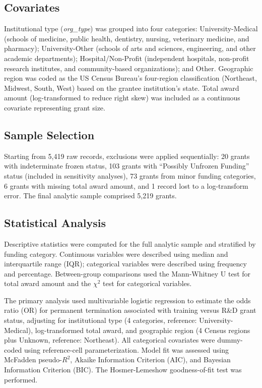 \documentclass[10pt, letterpaper]{article}
\begin{document}
\subsection*{Covariates}

Institutional type (\textit{org\_type}) was grouped into four categories: University-Medical (schools of medicine, public health, dentistry, nursing, veterinary medicine, and pharmacy); University-Other (schools of arts and sciences, engineering, and other academic departments); Hospital/Non-Profit (independent hospitals, non-profit research institutes, and community-based organizations); and Other. Geographic region was coded as the US Census Bureau's four-region classification (Northeast, Midwest, South, West) based on the grantee institution's state. Total award amount (log-transformed to reduce right skew) was included as a continuous covariate representing grant size.

\subsection*{Sample Selection}

Starting from 5,419 raw records, exclusions were applied sequentially: 20 grants with indeterminate frozen status, 103 grants with ``Possibly Unfrozen Funding'' status (included in sensitivity analyses), 73 grants from minor funding categories, 6 grants with missing total award amount, and 1 record lost to a log-transform error. The final analytic sample comprised 5,219 grants.

\subsection*{Statistical Analysis}

Descriptive statistics were computed for the full analytic sample and stratified by funding category. Continuous variables were described using median and interquartile range (IQR); categorical variables were described using frequency and percentage. Between-group comparisons used the Mann-Whitney U test for total award amount and the $\chi^{2}$ test for categorical variables.

The primary analysis used multivariable logistic regression to estimate the odds ratio (OR) for permanent termination associated with training versus R\&D grant status, adjusting for institutional type (4 categories, reference: University-Medical), log-transformed total award, and geographic region (4 Census regions plus Unknown, reference: Northeast). All categorical covariates were dummy-coded using reference-cell parameterization. Model fit was assessed using McFadden pseudo-$R^{2}$, Akaike Information Criterion (AIC), and Bayesian Information Criterion (BIC). The Hosmer-Lemeshow goodness-of-fit test was performed.
\end{document}
